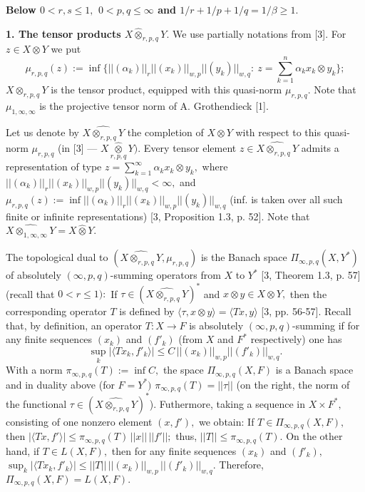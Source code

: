    {\bf Below $0<r, s\le1,$ $0< p,q \le\infty$ and $1/r+1/p+1/q=1/\beta\ge1.$}


      \medskip

       {\bf 1. The tensor products $X\widehat\otimes_{r,p,q} Y.$}
       We use partially nota\-ti\-ons from [3].
   For $z\in X\otimes Y$ we put
  $$\mu_{r,p,q}(z):= \inf\{||(\alpha_k)||_r ||(x_k)||_{w,p} ||(y_k)||_{w,q}:\
  z=\sum_{k=1}^n \alpha_k x_k\otimes y_k\};$$
$X\otimes_{r,p,q} Y$ is the tensor product, equipped with this quasi-norm $\mu_{r,p,q}.$
Note that $\mu_{1,\infty,\infty}$ is the projective tensor norm of A. Grothendieck [1].

Let us denote by $\widehat{X\otimes_{r,p,q} Y}$ the completion of $X\otimes Y$ with respect to
this quasi-norm $\mu_{r,p,q}$ (in [3] --- $X\underset{r,p,q}{\widehat\otimes} Y).$
Every tensor element $z\in \widehat{X\otimes_{r,p,q} Y}$
admits a representation of type
$z= \sum_{k=1}^\infty \alpha_k x_k\otimes y_k,$
where $||(\alpha_k)||_r ||(x_k)||_{w,p} ||(y_k)||_{w,q}<\infty,$ and
$\mu_{r,p,q}(z):= \inf ||(\alpha_k)||_r ||(x_k)||_{w,p} ||(y_k)||_{w,q}$
(inf. is taken over all such finite or infinite representations) [3, Proposition 1.3, p. 52].
Note that $\widehat{X\otimes_{1,\infty,\infty} Y}= X\widehat\otimes Y.$

The topological dual to $(\widehat{X\otimes_{r,p,q} Y}, \mu_{r,p,q})$ is the Banach space
$\Pi_{\infty,p,q}(X,Y^*)$ of absolutely $(\infty,p,q)$-summing operators
from $X$ to $Y^*$ [3, Theorem 1.3, p. 57]
(recall that $0<r\le1):$ If $\tau\in (\widehat{X\otimes_{r,p,q} Y})^*$ and
$x\otimes y\in X\otimes Y,$ then the corresponding operator $T$
is defined by $\langle \tau, x\otimes y\rangle= \langle Tx, y\rangle$ [3, pp. 56-57].
Recall that, by definition, an operator $T: X\to F$ is
absolutely $(\infty,p,q)$-summing if for any finite sequences
$(x_k)$ and $(f'_k)$ (from $X$ and $F^*$ respectively) one has
$$ \sup_k |\langle Tx_k, f'_k\rangle|\le C\, ||(x_k)||_{w,p} ||(f'_k)||_{w,q}.
$$
With a norm $\pi_{\infty,p,q}(T):= \inf C,$ the space
 $\Pi_{\infty,p,q}(X, F)$ is a Banach space and in duality above (for $F=Y^*)$
 $\pi_{\infty,p,q}(T)= ||\tau||$ (on the right, the norm of the functional
  $\tau\in(\widehat{X\otimes_{r,p,q} Y})^*$).
 Futhermore, taking a sequence in $X\times F^*,$ consisting of one nonzero element
 $(x,f'),$ we obtain: If $T\in \Pi_{\infty,p,q}(X, F),$ then
 $|\langle Tx, f'\rangle|\le \pi_{\infty,p,q}(T)\, ||x||\, ||f'||;$
 thus, $||T||\le \pi_{\infty,p,q}(T).$
  On the other hand, if $T\in L(X,F),$ then
for any finite sequences $(x_k)$ and $(f'_k),$ \,
$\sup_k |\langle Tx_k, f'_k\rangle|\le
 ||T||\, ||(x_k)||_{w,p}\, ||(f'_k)||_{w,q}.$
 There\-fo\-re,
 $\Pi_{\infty,p,q}(X, F)= L(X, F).$

